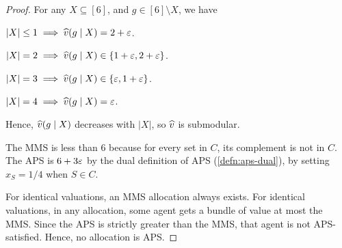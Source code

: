 \begin{proof}
For any $X \subseteq [6]$, and $g \in [6] \setminus X$, we have
\begin{tightenum}
\item $|X| \le 1 \implies \widehat{v}(g \mid X) = 2 + \varepsilon$.
\item $|X| = 2 \implies \widehat{v}(g \mid X) \in \{1 + \varepsilon, 2 + \varepsilon\}$.
\item $|X| = 3 \implies \widehat{v}(g \mid X) \in \{\varepsilon, 1 + \varepsilon\}$.
\item $|X| = 4 \implies \widehat{v}(g \mid X) = \varepsilon$.
\end{tightenum}
Hence, $\widehat{v}(g \mid X)$ decreases with $|X|$, so $\widehat{v}$ is submodular.

The MMS is less than 6 because for every set in $C$,
its complement is not in $C$.
The APS is $6 + 3\varepsilon$ by the dual definition of APS (\cref{defn:aps-dual}),
by setting $x_S = 1/4$ when $S \in C$.

For identical valuations, an MMS allocation always exists.
For identical valuations, in any allocation, some agent gets a bundle of value at most the MMS.
Since the APS is strictly greater than the MMS, that agent is not APS-satisfied.
Hence, no allocation is APS.
\end{proof}

